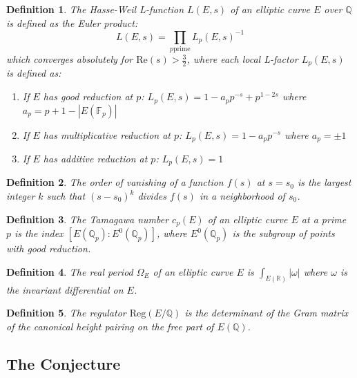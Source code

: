 \documentclass{article}
\newtheorem{definition}{Definition}
\begin{document}
\begin{definition}
  The Hasse-Weil L-function $L (E, s)$ of an elliptic curve $E$ over
  $\mathbb{Q}$ is defined as the Euler product:
  \[ L (E, s) = \prod_{p \text{prime}} L_p (E, s)^{- 1} \]
  which converges absolutely for $\mathrm{Re} (s) > \frac{3}{2}$, where each
  local L-factor $L_p (E, s)$ is defined as:
  \begin{enumerate}
    \item If $E$ has good reduction at $p$: $L_p (E, s) = 1 - a_p p^{- s} +
    p^{1 - 2 s}$ where $a_p = p + 1 - |E (\mathbb{F}_p) |$
    
    \item If $E$ has multiplicative reduction at $p$: $L_p (E, s) = 1 - a_p
    p^{- s}$ where $a_p = \pm 1$
    
    \item If $E$ has additive reduction at $p$: $L_p (E, s) = 1$
  \end{enumerate}
\end{definition}

\begin{definition}
  The order of vanishing of a function $f (s)$ at $s = s_0$ is the largest
  integer $k$ such that $(s - s_0)^k$ divides $f (s)$ in a neighborhood of
  $s_0$.
\end{definition}

\begin{definition}
  The Tamagawa number $c_p (E)$ of an elliptic curve $E$ at a prime $p$ is the
  index $[E (\mathbb{Q}_p) : E^0 (\mathbb{Q}_p)]$, where $E^0 (\mathbb{Q}_p)$
  is the subgroup of points with good reduction.
\end{definition}

\begin{definition}
  The real period $\Omega_E$ of an elliptic curve $E$ is $\int_{E
  (\mathbb{R})} | \omega |$ where $\omega$ is the invariant differential on
  $E$.
\end{definition}

\begin{definition}
  The regulator $\mathrm{Reg} (E /\mathbb{Q})$ is the determinant of the Gram
  matrix of the canonical height pairing on the free part of $E (\mathbb{Q})$.
\end{definition}

\subsection{The Conjecture}
\end{document}

